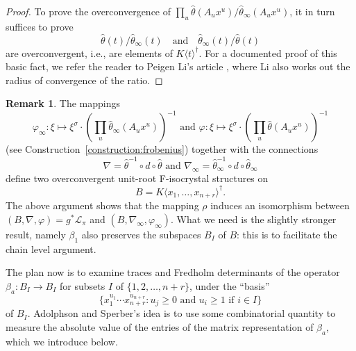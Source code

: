 \documentclass{amsart}
\numberwithin{equation}{section}
\theoremstyle{plain}
\theoremstyle{definition}
\newtheorem{remark}[equation]{Remark}
\begin{document}
\begin{proof}
To prove the overconvergence of
\(\prod_{u}\widehat{\theta}(A_{u}x^{u})/\widehat{\theta}_{\infty}(A_{u}x^{u})\),
it in turn suffices to prove
\begin{equation*}
\widehat{\theta}(t)/\widehat{\theta}_{\infty}(t)\quad\text{and} \quad
\widehat{\theta}_{\infty}(t)/\widehat{\theta}(t)
\end{equation*}
are overconvergent, i.e., are elements of
\(K\langle t \rangle^{\dagger}\).  For a documented proof of this
basic fact, we refer the reader to Peigen Li's article
\cite[Proposition~2.1(i)]{li_peigen:exponential-sums-and-rigid-cohomology},
where Li also works out the radius of convergence of the ratio.
\end{proof}


\begin{remark}
The mappings
\begin{equation*}
\varphi_{\infty}\colon \xi \mapsto \xi^{\sigma} \cdot \left( \prod_{u} \widehat{\theta}_{\infty}(A_{u}x^{u}) \right)^{-1}
\text{ and }
\varphi\colon \xi \mapsto \xi^{\sigma} \cdot \left( \prod_{u} \widehat{\theta}(A_{u}x^{u}) \right)^{-1}
\end{equation*}
(see Construction~\ref{construction:frobenius}) together with the
connections
\begin{equation*}
\nabla = \widehat{\theta}^{-1} \circ d \circ \widehat{\theta}
\text{ and }
\nabla_{\infty} = \widehat{\theta}_{\infty}^{-1} \circ d \circ \widehat{\theta}_{\infty}
\end{equation*}
define two overconvergent unit-root F-isocrystal structures on
\begin{equation*}
B = K\langle x_{1},\ldots,x_{n+r} \rangle^{\dagger}.
\end{equation*}
The above argument shows that the mapping \(\rho\) induces an
isomorphism between \((B,\nabla,\varphi) = g^{\ast}\mathcal{L}_{\pi}\) and
\((B,\nabla_{\infty}, \varphi_{\infty})\).  What we need is the slightly
stronger result, namely \(\beta_{1}\) also preserves the subspaces
\(B_{I}\) of \(B\): this is to facilitate the chain level argument.
\end{remark}

The plan now is to examine traces and Fredholm determinants of the
operator \(\beta_{a}\colon B_{I} \to B_{I}\) for subsets \(I\) of
\(\{1,2,\ldots,n+r\}\), under the ``basis''
\[
\{x_{1}^{u_{1}}\cdots x_{n+r}^{u_{n+r}}:u_{j}\geq0\text{ and }u_{i}\geq 1\text{ if }i\in I\}
\]
of \(B_{I}\).  Adolphson and Sperber's idea is to use some
combinatorial quantity to measure the absolute value of the entries of the
matrix representation of \(\beta_{a}\), which we introduce below.
\end{document}
